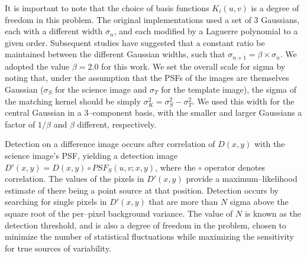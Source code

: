 \documentclass[floatfix, apj]{emulateapj}
\begin{document}
It is important to note that the choice of basis functions $K_i(u,v)$ is a degree of freedom in this problem.
The original implementations \citep{Alard98,Alard00} used a set of 3 Gaussians, each with a different width $\sigma_n$, and each modified by a Laguerre polynomial to a given order.
Subsequent studies \citep[e.g.][]{2007AN....328...16I} have suggested that a constant ratio be maintained between the different Gaussian widths, such that $\sigma_{n+1} = \beta \times \sigma_{n}$.
We adopted the value $\beta = 2.0$ for this work.
We set the overall scale for sigma by noting that, under the assumption that the PSFs of the images are themselves Gaussian ($\sigma_S$ for the science image and $\sigma_T$ for the template image), the sigma of the matching kernel should be simply $\sigma_K^2 = \sigma_S^2 - \sigma_T^2$.
We used this width for the central Gaussian in a 3--component basis, with the smaller and larger Gaussians a factor of $1/\beta$ and $\beta$ different, respectively.

Detection on a difference image occurs after correlation of $D(x,y)$ with the science image's PSF, yielding a detection image $D'(x,y) = D(x,y) \circ PSF_S(u,v;x,y)$, where the $\circ$ operator denotes correlation.
The values of the pixels in $D'(x,y)$ provide a maximum--likelihood estimate of there being a point source at that position.
Detection occurs by searching for single pixels in $D'(x,y)$ that are more than $N$ sigma above the square root of the per--pixel background variance.
The value of $N$ is known as the detection threshold, and is also a degree of freedom in the problem, chosen to minimize the number of statistical fluctuations while maximizing the sensitivity for true sources of variability.
\end{document}
